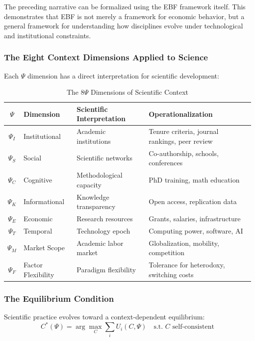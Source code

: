 The preceding narrative can be formalized using the EBF framework itself.
This demonstrates that EBF is not merely a framework for economic behavior,
but a general framework for understanding how disciplines evolve under
technological and institutional constraints.

\subsubsection{The Eight Context Dimensions Applied to Science}

Each $\Psi$ dimension has a direct interpretation for scientific development:

\begin{table}[htbp]
\centering
\caption{The 8$\Psi$ Dimensions of Scientific Context}
\label{tab:8psi-science}
\renewcommand{\arraystretch}{1.3}
\small
\begin{tabular}{@{}clp{4.5cm}p{4cm}@{}}
\toprule
$\Psi$ & \textbf{Dimension} & \textbf{Scientific Interpretation} & \textbf{Operationalization} \\
\midrule
$\Psi_I$ & Institutional & Academic institutions & Tenure criteria, journal rankings, peer review \\
$\Psi_S$ & Social & Scientific networks & Co-authorship, schools, conferences \\
$\Psi_C$ & Cognitive & Methodological capacity & PhD training, math education \\
$\Psi_K$ & Informational & Knowledge transparency & Open access, replication data \\
$\Psi_E$ & Economic & Research resources & Grants, salaries, infrastructure \\
$\Psi_T$ & Temporal & Technology epoch & Computing power, software, AI \\
$\Psi_M$ & Market Scope & Academic labor market & Globalization, mobility, competition \\
$\Psi_F$ & Factor Flexibility & Paradigm flexibility & Tolerance for heterodoxy, switching costs \\
\bottomrule
\end{tabular}
\end{table}

\subsubsection{The Equilibrium Condition}

Scientific practice evolves toward a context-dependent equilibrium:
\begin{equation}
C^*(\Psi) = \arg\max_C \sum_i U_i(C, \Psi) \quad \text{s.t. } C \text{ self-consistent}
\end{equation}

